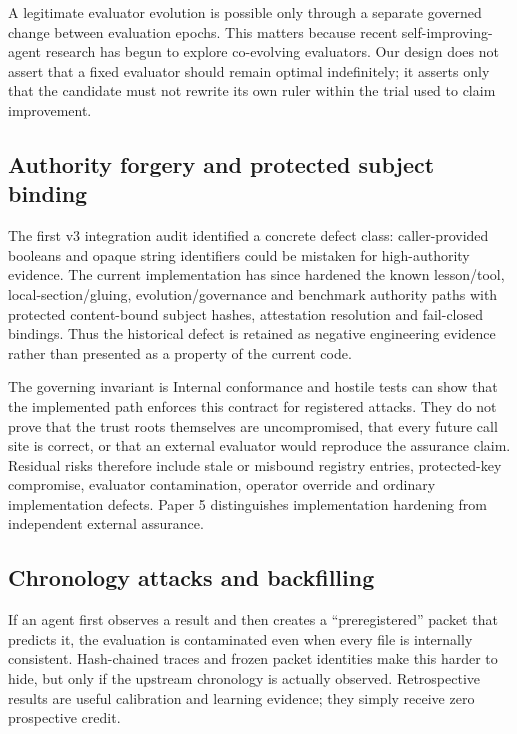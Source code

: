 A legitimate evaluator evolution is possible only through a separate governed change between evaluation epochs. This matters because recent self-improving-agent research has begun to explore co-evolving evaluators. Our design does not assert that a fixed evaluator should remain optimal indefinitely; it asserts only that the candidate must not rewrite its own ruler within the trial used to claim improvement.

\subsection{Authority forgery and protected subject binding}

The first v3 integration audit identified a concrete defect class: caller-provided booleans and opaque string identifiers could be mistaken for high-authority evidence. The current implementation has since hardened the known lesson/tool, local-section/gluing, evolution/governance and benchmark authority paths with protected content-bound subject hashes, attestation resolution and fail-closed bindings. Thus the historical defect is retained as negative engineering evidence rather than presented as a property of the current code.

The governing invariant is
Internal conformance and hostile tests can show that the implemented path enforces this contract for registered attacks. They do not prove that the trust roots themselves are uncompromised, that every future call site is correct, or that an external evaluator would reproduce the assurance claim. Residual risks therefore include stale or misbound registry entries, protected-key compromise, evaluator contamination, operator override and ordinary implementation defects. Paper 5 distinguishes implementation hardening from independent external assurance.

\subsection{Chronology attacks and backfilling}

If an agent first observes a result and then creates a ``preregistered'' packet that predicts it, the evaluation is contaminated even when every file is internally consistent. Hash-chained traces and frozen packet identities make this harder to hide, but only if the upstream chronology is actually observed. Retrospective results are useful calibration and learning evidence; they simply receive zero prospective credit.

